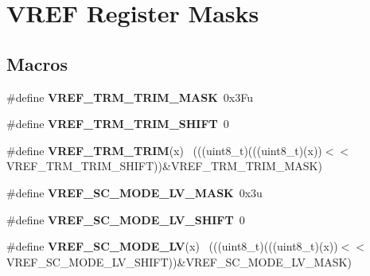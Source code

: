 \hypertarget{group___v_r_e_f___register___masks}{}\section{V\+R\+E\+F Register Masks}
\label{group___v_r_e_f___register___masks}
\subsection*{Macros}
\begin{DoxyCompactItemize}
\item 
\hypertarget{group___v_r_e_f___register___masks_gaf233ddf56401003ec721b808d3910978}{}\#define {\bfseries V\+R\+E\+F\+\_\+\+T\+R\+M\+\_\+\+T\+R\+I\+M\+\_\+\+M\+A\+S\+K}~0x3\+Fu\label{group___v_r_e_f___register___masks_gaf233ddf56401003ec721b808d3910978}

\item 
\hypertarget{group___v_r_e_f___register___masks_ga7738b4edb18c8c9dcb36d6be564c80e6}{}\#define {\bfseries V\+R\+E\+F\+\_\+\+T\+R\+M\+\_\+\+T\+R\+I\+M\+\_\+\+S\+H\+I\+F\+T}~0\label{group___v_r_e_f___register___masks_ga7738b4edb18c8c9dcb36d6be564c80e6}

\item 
\hypertarget{group___v_r_e_f___register___masks_gac340a7abf4c9caf1594346d71a475a30}{}\#define {\bfseries V\+R\+E\+F\+\_\+\+T\+R\+M\+\_\+\+T\+R\+I\+M}(x)                                              ~(((uint8\+\_\+t)(((uint8\+\_\+t)(x))$<$$<$V\+R\+E\+F\+\_\+\+T\+R\+M\+\_\+\+T\+R\+I\+M\+\_\+\+S\+H\+I\+F\+T))\&V\+R\+E\+F\+\_\+\+T\+R\+M\+\_\+\+T\+R\+I\+M\+\_\+\+M\+A\+S\+K)\label{group___v_r_e_f___register___masks_gac340a7abf4c9caf1594346d71a475a30}

\item 
\hypertarget{group___v_r_e_f___register___masks_ga7eb8ab4b25ed9f93b23d7199c50e7181}{}\#define {\bfseries V\+R\+E\+F\+\_\+\+S\+C\+\_\+\+M\+O\+D\+E\+\_\+\+L\+V\+\_\+\+M\+A\+S\+K}~0x3u\label{group___v_r_e_f___register___masks_ga7eb8ab4b25ed9f93b23d7199c50e7181}

\item 
\hypertarget{group___v_r_e_f___register___masks_ga3130891ca865a042a784a2c3bc7141b0}{}\#define {\bfseries V\+R\+E\+F\+\_\+\+S\+C\+\_\+\+M\+O\+D\+E\+\_\+\+L\+V\+\_\+\+S\+H\+I\+F\+T}~0\label{group___v_r_e_f___register___masks_ga3130891ca865a042a784a2c3bc7141b0}

\item 
\hypertarget{group___v_r_e_f___register___masks_gada46f0a4d5c228d2193c8f292631265f}{}\#define {\bfseries V\+R\+E\+F\+\_\+\+S\+C\+\_\+\+M\+O\+D\+E\+\_\+\+L\+V}(x)                                          ~(((uint8\+\_\+t)(((uint8\+\_\+t)(x))$<$$<$V\+R\+E\+F\+\_\+\+S\+C\+\_\+\+M\+O\+D\+E\+\_\+\+L\+V\+\_\+\+S\+H\+I\+F\+T))\&V\+R\+E\+F\+\_\+\+S\+C\+\_\+\+M\+O\+D\+E\+\_\+\+L\+V\+\_\+\+M\+A\+S\+K)\label{group___v_r_e_f___register___masks_gada46f0a4d5c228d2193c8f292631265f}


\end{DoxyCompactItemize}
